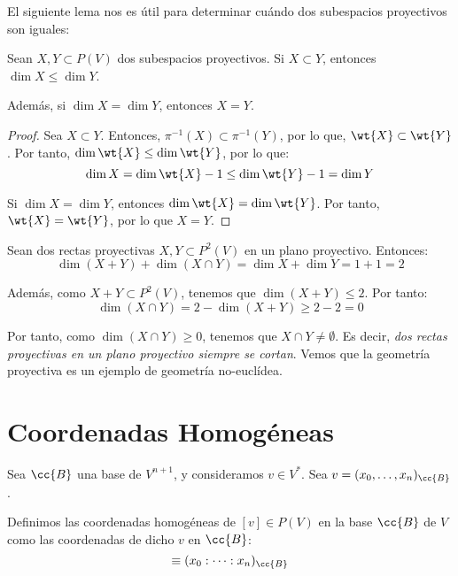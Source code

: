 El siguiente lema nos es útil para determinar cuándo dos subespacios proyectivos son iguales:
\begin{lema}
    Sean $X,Y\subset P(V)$ dos subespacios proyectivos. Si $X\subset Y$, entonces $\dim X \leq \dim Y$.

    Además, si $\dim X = \dim Y$, entonces $X=Y$.
\end{lema}
\begin{proof}
    Sea $X\subset Y$. Entonces, $\pi^{-1}(X)\subset \pi^{-1}(Y)$, por lo que, $\wt{X} \subset \wt{Y}$. Por tanto, $\dim \wt{X} \leq \dim \wt{Y}$, por lo que:
    \begin{equation*}
        \dim X = \dim \wt{X} - 1 \leq \dim \wt{Y} - 1 = \dim Y
    \end{equation*}

    Si $\dim X = \dim Y$, entonces $\dim \wt{X} = \dim \wt{Y}$. Por tanto, $\wt{X}=\wt{Y}$, por lo que $X=Y$.
\end{proof}

\begin{ejemplo}
    Sean dos rectas proyectivas $X,Y\subset P^2({V})$ en un plano proyectivo. Entonces:
    \begin{equation*}
        \dim (X+Y) + \dim (X\cap Y) = \dim X + \dim Y = 1+1 = 2
    \end{equation*}

    Además, como $X+Y\subset P^2({V})$, tenemos que $\dim (X+Y) \leq 2$. Por tanto:
    \begin{equation*}
        \dim (X\cap Y) = 2 - \dim (X+Y) \geq 2 - 2 = 0
    \end{equation*}

    Por tanto, como $\dim (X\cap Y) \geq 0$, tenemos que $X\cap Y\neq \emptyset$. Es decir, \emph{dos rectas proyectivas en un plano proyectivo siempre se cortan}.
    Vemos que la geometría proyectiva es un ejemplo de geometría no-euclídea.
\end{ejemplo}



\section{Coordenadas Homogéneas}

Sea $\cc{B}$ una base de $V^{n+1}$, y consideramos $v \in V^\ast$. Sea $v=(x_0,\dots,x_n)_{\cc{B}}$.

Definimos las coordenadas homogéneas de $[v]\in P(V)$ en la base $\cc{B}$ de $V$ como las coordenadas de dicho $v$ en $\cc{B}$:
\begin{equation*}
    [v] \equiv (x_0:\dots :x_n)_{\cc{B}}
\end{equation*}

